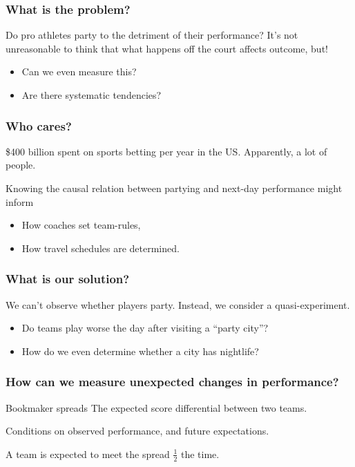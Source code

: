 \documentclass{beamer}
\begin{document}
  \begin{frame} \maketitle \end{frame}

\begin{frame}   \frametitle{What is the problem?}
  \begin{block}{Do pro athletes party to the detriment of their performance?}
    It's not unreasonable to think that what happens off the court affects outcome, but!
    \begin{itemize}       \item Can we even measure this?
      \item Are there systematic tendencies?     \end{itemize}
  \end{block} \end{frame}

\begin{frame}   
  \frametitle{Who cares?}
  \begin{block}{\$400 billion spent on sports betting per year in the US.}
    Apparently, a lot of people. 

    Knowing the causal relation between partying and next-day performance might inform
    \begin{itemize}       \item How coaches set team-rules, 
      \item How travel schedules are determined.     \end{itemize}
  \end{block}
\end{frame}

\begin{frame}   
  \frametitle{What is our solution?}
  \begin{block}{We can't observe whether players party.}
    Instead, we consider a quasi-experiment.
    \begin{itemize}       \item Do teams play worse the day after visiting a ``party city''?
      \item How do we even determine whether a city has nightlife?     \end{itemize}
  \end{block}
\end{frame}

\begin{frame}
  \frametitle{How can we measure unexpected changes in performance?}   \begin{block}{Bookmaker spreads}     The expected score differential between two teams.

    Conditions on observed performance, and future expectations.

    A team is expected to meet the spread $\frac{1}{2}$ the time.   \end{block} \end{frame}
\end{document}
